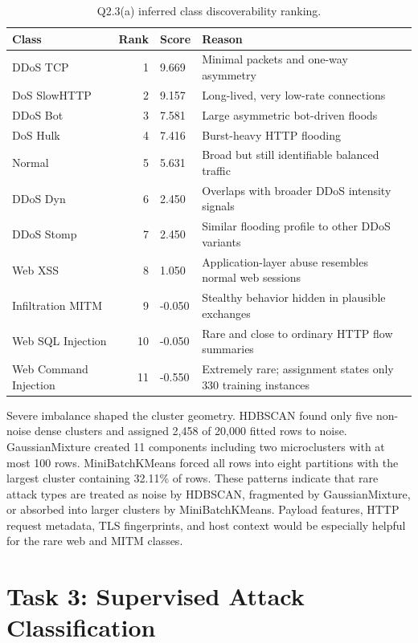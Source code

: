 \documentclass[journal,onecolumn]{IEEEtran}
\begin{document}
\begin{table}[H]
\caption{Q2.3(a) inferred class discoverability ranking.}
\label{tab:q2_discoverability}
\centering
\small
\begin{tabularx}{0.95\linewidth}{@{}lrlY@{}}
\toprule
Class & Rank & Score & Reason \\
\midrule
DDoS TCP & 1 & 9.669 & Minimal packets and one-way asymmetry \\
DoS SlowHTTP & 2 & 9.157 & Long-lived, very low-rate connections \\
DDoS Bot & 3 & 7.581 & Large asymmetric bot-driven floods \\
DoS Hulk & 4 & 7.416 & Burst-heavy HTTP flooding \\
Normal & 5 & 5.631 & Broad but still identifiable balanced traffic \\
DDoS Dyn & 6 & 2.450 & Overlaps with broader DDoS intensity signals \\
DDoS Stomp & 7 & 2.450 & Similar flooding profile to other DDoS variants \\
Web XSS & 8 & 1.050 & Application-layer abuse resembles normal web sessions \\
Infiltration MITM & 9 & -0.050 & Stealthy behavior hidden in plausible exchanges \\
Web SQL Injection & 10 & -0.050 & Rare and close to ordinary HTTP flow summaries \\
Web Command Injection & 11 & -0.550 & Extremely rare; assignment states only 330 training instances \\
\bottomrule
\end{tabularx}
\end{table}

Severe imbalance shaped the cluster geometry. HDBSCAN found only five non-noise dense clusters and assigned 2,458 of 20,000 fitted rows to noise. GaussianMixture created 11 components including two microclusters with at most 100 rows. MiniBatchKMeans forced all rows into eight partitions with the largest cluster containing 32.11\% of rows. These patterns indicate that rare attack types are treated as noise by HDBSCAN, fragmented by GaussianMixture, or absorbed into larger clusters by MiniBatchKMeans. Payload features, HTTP request metadata, TLS fingerprints, and host context would be especially helpful for the rare web and MITM classes.

\clearpage

\section{Task 3: Supervised Attack Classification}
\end{document}
